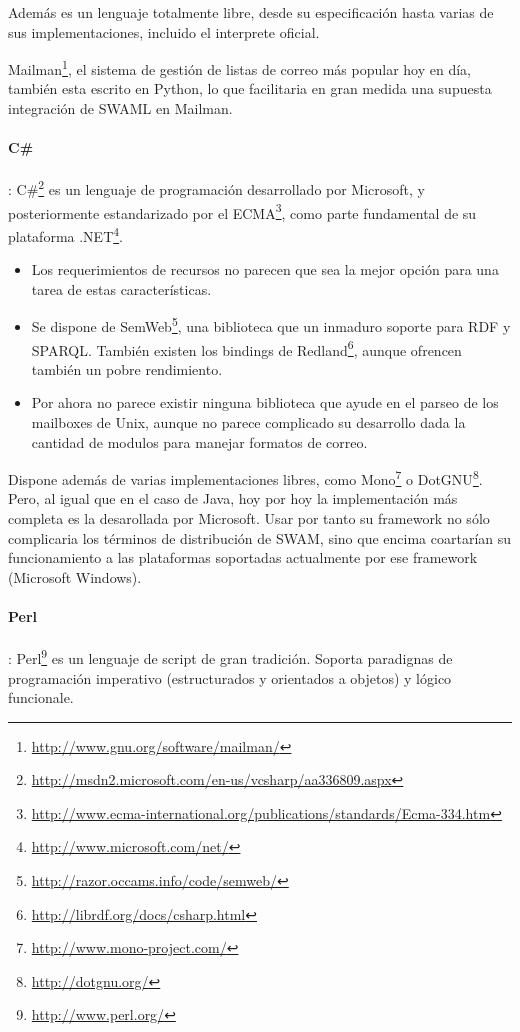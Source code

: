 Además es un lenguaje totalmente libre, desde su especificación hasta varias
de sus implementaciones, incluido el interprete oficial.

Mailman\footnote{\url{http://www.gnu.org/software/mailman/}}, el sistema de gestión
de listas de correo más popular hoy en día, también esta escrito en Python, lo que 
facilitaria en gran medida una supuesta integración de SWAML en Mailman.


\paragraph{C\#}: C\#\footnote{\url{http://msdn2.microsoft.com/en-us/vcsharp/aa336809.aspx}} 
es un lenguaje de programación desarrollado por Microsoft, y posteriormente estandarizado por el ECMA\footnote{\url{http://www.ecma-international.org/publications/standards/Ecma-334.htm}},
como parte fundamental de su plataforma .NET\footnote{\url{http://www.microsoft.com/net/}}.

\begin{itemize}
  \item Los requerimientos de recursos no parecen que sea la mejor opción para una tarea
	de estas características.
  \item Se dispone de SemWeb\footnote{\url{http://razor.occams.info/code/semweb/}}, una
	biblioteca que un inmaduro soporte para RDF y SPARQL. También existen los bindings 
	de Redland\footnote{\url{http://librdf.org/docs/csharp.html}}, aunque ofrencen también
	un pobre rendimiento.
  \item Por ahora no parece existir ninguna biblioteca que ayude en el parseo de los mailboxes 
	de Unix, aunque no parece complicado su desarrollo dada la cantidad de modulos para 
	manejar formatos de correo.
\end{itemize}

Dispone además de varias implementaciones libres, como 
Mono\footnote{\url{http://www.mono-project.com/}} o DotGNU\footnote{\url{http://dotgnu.org/}}.
Pero, al igual que en el caso de Java, hoy por hoy la implementación más completa es la
desarollada por Microsoft. Usar por tanto su framework no sólo complicaria los términos
de distribución de SWAM, sino que encima coartarían su funcionamiento a las plataformas
soportadas actualmente por ese framework (Microsoft Windows).


\paragraph{Perl}: Perl\footnote{\url{http://www.perl.org/}} es un lenguaje de script de 
gran tradición. Soporta paradignas de programación imperativo (estructurados y orientados 
a objetos) y lógico funcionale.

